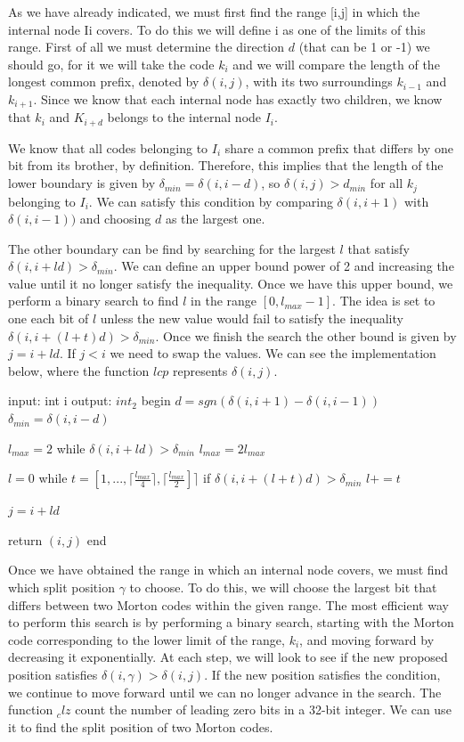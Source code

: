 \documentclass[titlepage,12pt]{report}
\begin{document}
As we have already indicated, we must first find the range [i,j] in which the internal node Ii covers. To do this we will define i as one of the limits of this range. First of all we must determine the direction $d$ (that can be 1 or -1) we should go, for it we will take the code $k_i$ and we will compare the length of the longest common prefix, denoted by $\delta(i,j)$, with its two surroundings $k_{i-1}$ and $k_{i+1}$. Since we know that each internal node has exactly two children, we know that $k_i$ and $K_{i+d}$ belongs to the internal node $I_i$. 

We know that all codes belonging to $I_i$ share a common prefix that differs by one bit from its brother, by definition. Therefore, this implies that the length of the lower boundary is given by $\delta_{min} = \delta(i,i-d)$, so $\delta(i,j) > d_{min}$ for all $k_j$ belonging to $I_i$. We can satisfy this condition by comparing $\delta(i,i+1)$ with $\delta(i,i-1))$ and choosing $d$ as the largest one.

The other boundary can be find by searching for the largest $l$ that satisfy $\delta(i,i+ld) > \delta_{min}$. We can define an upper bound power of 2 and increasing the value until it no longer satisfy the inequality. Once we have this upper bound, we perform a binary search to find $l$ in the range $[0, l_{max}-1]$. The idea is set to one each bit of $l$ unless the new value would fail to satisfy the inequality $\delta(i, i + (l + t)d) > \delta_{min}$. Once we finish the search the other bound is given by $j = i + ld$. If $j < i$ we need to swap the values. We can see the implementation below, where the function $lcp$ represents $\delta(i,j)$.

\begin{algorithm}[caption={range}, label={range_alg}]
input: int i
output: $int_2$
begin
  $d = sgn(\delta(i, i+1) - \delta(i, i-1))$
  $\delta_{min} = \delta(i, i-d)$
  
  $l_{max} = 2$  
  while $\delta(i, i+ld) > \delta_{min}$
    $l_{max} = 2l_{max}$

  $l = 0$
  while $t = [1, ... , \lceil \frac{l_{max}}{4} \rceil, \lceil \frac{l_{max}}{2}] \rceil$
    if $\delta(i, i + (l+t)d) > \delta_{min}$
      $l += t$
  
  $j = i + ld$
   
  return $(i,j)$
end
\end{algorithm}

Once we have obtained the range in which an internal node covers, we must find which split position $\gamma$ to choose. To do this, we will choose the largest bit that differs between two Morton codes within the given range. The most efficient way to perform this search is by performing a binary search, starting with the Morton code corresponding to the lower limit of the range, $k_i$, and moving forward by decreasing it exponentially. At each step, we will look to see if the new proposed position satisfies $\delta(i,\gamma) > \delta(i,j)$. If the new position satisfies the condition, we continue to move forward until we can no longer advance in the search. The function $_clz$ count the number of leading zero bits in a 32-bit integer. We can use it to find the split position of two Morton codes.
\end{document}

